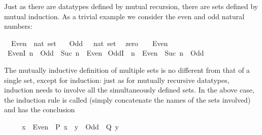 %
\begin{isabellebody}%
\def\isabellecontext{Mutual}%
%
\isadelimtheory
%
\endisadelimtheory
%
\isatagtheory
%
\endisatagtheory
{\isafoldtheory}%
%
\isadelimtheory
%
\endisadelimtheory
%
\isamarkuptrue%
%
\begin{isamarkuptext}%
Just as there are datatypes defined by mutual recursion, there are sets defined
by mutual induction. As a trivial example we consider the even and odd
natural numbers:%
\end{isamarkuptext}%
\isamarkuptrue%
\isamarkupfalse%
\isanewline
\ \ Even\ {}{}\ {}nat\ set{}\ \isanewline
\ \ Odd\ \ {}{}\ {}nat\ set{}\isanewline
{}\isanewline
\ \ zero{}\ \ {}{}\ {}\ Even{}\isanewline
{}\ EvenI{}\ {}n\ {}\ Odd\ {}\ Suc\ n\ {}\ Even{}\isanewline
{}\ OddI{}\ \ {}n\ {}\ Even\ {}\ Suc\ n\ {}\ Odd{}%
\begin{isamarkuptext}%
\noindent
The mutually inductive definition of multiple sets is no different from
that of a single set, except for induction: just as for mutually recursive
datatypes, induction needs to involve all the simultaneously defined sets. In
the above case, the induction rule is called 
(simply concatenate the names of the sets involved) and has the conclusion
\begin{isabelle}%
\ \ \ \ \ {}{}x\ {}\ Even\ {}\ {}P\ {}x{}\ {}\ {}{}y\ {}\ Odd\ {}\ {}Q\ {}y{}%
\end{isabelle}


\end{isamarkuptext}
\end{isabellebody}
